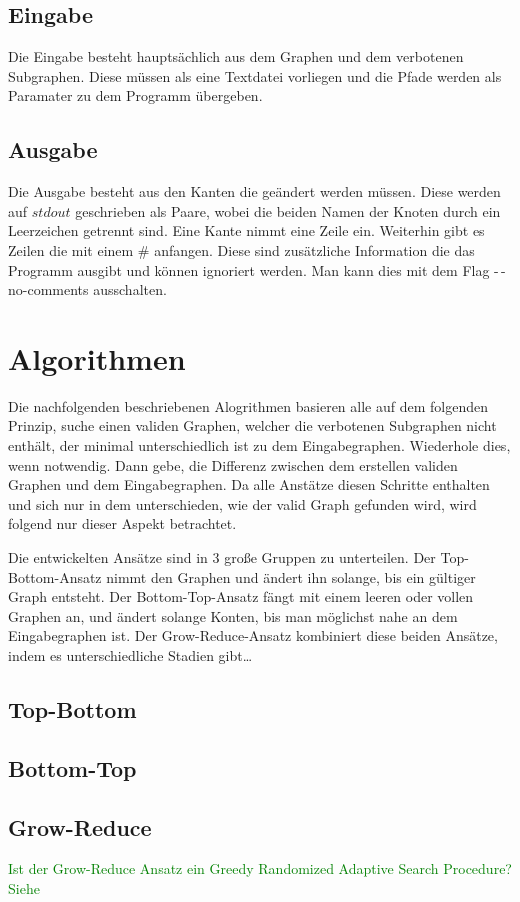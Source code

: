 \documentclass[12pt,a4paper,onecolumn,oneside,titlepage]{article}
\begin{document}
\subsection{Eingabe}
Die Eingabe besteht hauptsächlich aus dem Graphen und dem verbotenen Subgraphen. Diese müssen als eine Textdatei vorliegen und die Pfade werden als Paramater zu dem Programm übergeben.

\subsection{Ausgabe}
Die Ausgabe besteht aus den Kanten die geändert werden müssen. Diese werden auf $stdout$ geschrieben als Paare, wobei die beiden Namen der Knoten durch ein Leerzeichen getrennt sind. Eine Kante nimmt eine Zeile ein.
Weiterhin gibt es Zeilen die mit einem \# anfangen. Diese sind zusätzliche Information die das Programm ausgibt und können ignoriert werden. Man kann dies mit dem Flag -\,-no-comments ausschalten.

\section{Algorithmen}
Die nachfolgenden beschriebenen Alogrithmen basieren alle auf dem folgenden Prinzip, suche einen validen Graphen, welcher die verbotenen Subgraphen nicht enthält, der minimal unterschiedlich ist zu dem Eingabegraphen. Wiederhole dies, wenn notwendig. Dann gebe, die Differenz zwischen dem erstellen validen Graphen und dem Eingabegraphen.
Da alle Anstätze diesen Schritte enthalten und sich nur in dem unterschieden, wie der valid Graph gefunden wird, wird folgend nur dieser Aspekt betrachtet.

Die entwickelten Ansätze sind in 3 große Gruppen zu unterteilen.
Der Top-Bottom-Ansatz nimmt den Graphen und ändert ihn solange, bis ein gültiger Graph entsteht. Der Bottom-Top-Ansatz fängt mit einem leeren oder vollen Graphen an, und ändert solange Konten, bis man möglichst nahe an dem Eingabegraphen ist.
Der Grow-Reduce-Ansatz kombiniert diese beiden Ansätze, indem es unterschiedliche Stadien gibt… 

\subsection{Top-Bottom}
\subsection{Bottom-Top}
\subsection{Grow-Reduce}
\textcolor{green}{Ist der Grow-Reduce Ansatz ein Greedy Randomized Adaptive Search Procedure? Siehe \cite{Bastos2014}}
\end{document}
